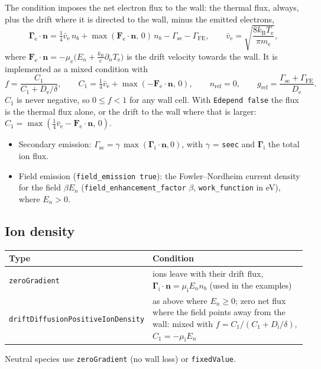 \documentclass[11pt,a4paper]{article}
\newcommand{\kw}[1]{\texttt{#1}}
\newcommand{\bG}{\boldsymbol{\Gamma}}
\newcommand{\bn}{\mathbf{n}}
\newcommand{\kB}{k_\mathrm{B}}
\newcommand{\Te}{T_\mathrm{e}}
\newcommand{\vth}{\bar v_\mathrm{e}}
\begin{document}
The condition imposes the net electron flux to the wall: the thermal flux,
always, plus the drift where it is directed to the wall, minus the emitted
electrons,
\begin{equation}
\bG_\mathrm{e}\cdot\bn = \tfrac14\vth\,n_b + \max(\mathbf{F}_\mathrm{e}\cdot\bn,\,0)\,n_b
 - \Gamma_\mathrm{se} - \Gamma_\mathrm{FE},
\qquad \vth=\sqrt{\frac{8\kB\Te}{\pi m_\mathrm{e}}} ,
\label{eq:bce}
\end{equation}
where $\mathbf{F}_\mathrm{e}\cdot\bn=-\mu_\mathrm{e}\big(E_n+\tfrac{\kB}{e}\partial_n\Te\big)$
is the drift velocity towards the wall. It is implemented as a mixed
condition with
\begin{equation}
f = \frac{C_1}{C_1+D_\mathrm{e}/\delta},\qquad
C_1=\tfrac14\vth+\max(-\mathbf{F}_\mathrm{e}\cdot\bn,\,0),
\qquad n_\mathrm{ref}=0,\qquad
g_\mathrm{ref}=\frac{\Gamma_\mathrm{se}+\Gamma_\mathrm{FE}}{D_\mathrm{e}} .
\end{equation}
$C_1$ is never negative, so $0\le f<1$ for any wall cell. With
\kw{Edepend false} the flux is the thermal flux alone, or the drift to the
wall where that is larger: $C_1=\max(\tfrac14\vth-\mathbf{F}_\mathrm{e}\cdot\bn,\,0)$.
\begin{itemize}
\item Secondary emission: $\Gamma_\mathrm{se}=\gamma\,\max(\bG_\mathrm{i}\cdot\bn,0)$,
      with $\gamma$ = \kw{seec} and $\bG_\mathrm{i}$ the total ion flux.
\item Field emission (\kw{field\_emission true}): the Fowler--Nordheim
      current density for the field $\beta E_n$ (\kw{field\_enhancement\_factor}
      $\beta$, \kw{work\_function} in eV), where $E_n>0$.
\end{itemize}

\subsection{Ion density}

\begin{center}
\begin{tabular}{@{}L{6.3cm}L{8.9cm}@{}}
\toprule
Type & Condition \\
\midrule
\kw{zeroGradient} & ions leave with their drift flux, $\bG_\mathrm{i}\cdot\bn=\mu_\mathrm{i}E_n n_b$ (used in the examples) \\[3pt]
\kw{driftDiffusionPositiveIonDensity} & as above where $E_n\ge0$; zero net flux where the field points away from the wall: mixed with $f=C_1/(C_1+D_\mathrm{i}/\delta)$, $C_1=-\mu_\mathrm{i}E_n$ \\
\bottomrule
\end{tabular}
\end{center}
Neutral species use \kw{zeroGradient} (no wall loss) or \kw{fixedValue}.
\end{document}
